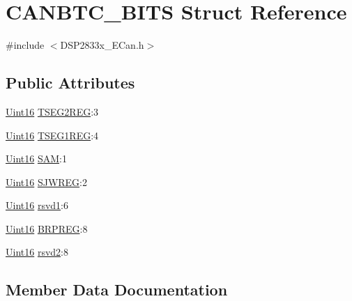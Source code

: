 \hypertarget{struct_c_a_n_b_t_c___b_i_t_s}{}\section{C\+A\+N\+B\+T\+C\+\_\+\+B\+I\+T\+S Struct Reference}
\label{struct_c_a_n_b_t_c___b_i_t_s}


{\ttfamily \#include $<$D\+S\+P2833x\+\_\+\+E\+Can.\+h$>$}

\subsection*{Public Attributes}
\begin{DoxyCompactItemize}
\item 
\hyperlink{_d_s_p2833x___device_8h_a59a9f6be4562c327cbfb4f7e8e18f08b}{Uint16} \hyperlink{struct_c_a_n_b_t_c___b_i_t_s_a59094b1d29f7416b3f8965b0a42dfdc9}{T\+S\+E\+G2\+R\+E\+G}\+:3
\item 
\hyperlink{_d_s_p2833x___device_8h_a59a9f6be4562c327cbfb4f7e8e18f08b}{Uint16} \hyperlink{struct_c_a_n_b_t_c___b_i_t_s_a11366a83394bbe82e7fd2b0cbff92275}{T\+S\+E\+G1\+R\+E\+G}\+:4
\item 
\hyperlink{_d_s_p2833x___device_8h_a59a9f6be4562c327cbfb4f7e8e18f08b}{Uint16} \hyperlink{struct_c_a_n_b_t_c___b_i_t_s_a7bbeaf84dfa1b7805f279fb1e8e8ad5b}{S\+A\+M}\+:1
\item 
\hyperlink{_d_s_p2833x___device_8h_a59a9f6be4562c327cbfb4f7e8e18f08b}{Uint16} \hyperlink{struct_c_a_n_b_t_c___b_i_t_s_a5c17a463e0d84445ae3953991e68ef16}{S\+J\+W\+R\+E\+G}\+:2
\item 
\hyperlink{_d_s_p2833x___device_8h_a59a9f6be4562c327cbfb4f7e8e18f08b}{Uint16} \hyperlink{struct_c_a_n_b_t_c___b_i_t_s_a25e72800f7efde1e3aa82cc4d5f6502f}{rsvd1}\+:6
\item 
\hyperlink{_d_s_p2833x___device_8h_a59a9f6be4562c327cbfb4f7e8e18f08b}{Uint16} \hyperlink{struct_c_a_n_b_t_c___b_i_t_s_ab9d2e49e507b306a3b9c53a1a3cb8b29}{B\+R\+P\+R\+E\+G}\+:8
\item 
\hyperlink{_d_s_p2833x___device_8h_a59a9f6be4562c327cbfb4f7e8e18f08b}{Uint16} \hyperlink{struct_c_a_n_b_t_c___b_i_t_s_a04c895111763f3bf791add2da36abe3d}{rsvd2}\+:8
\end{DoxyCompactItemize}


\subsection{Member Data Documentation}
\hypertarget{struct_c_a_n_b_t_c___b_i_t_s_ab9d2e49e507b306a3b9c53a1a3cb8b29}{}
